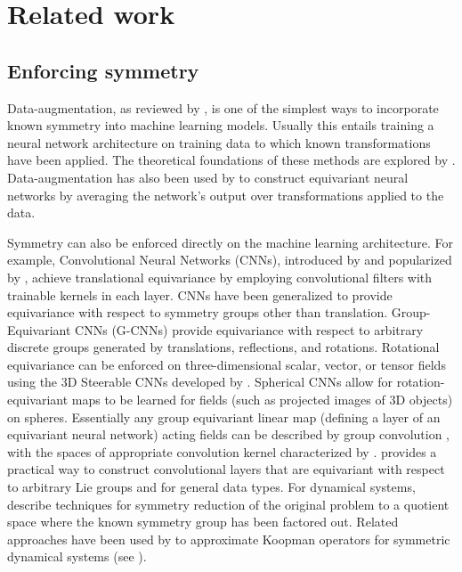 \documentclass[twoside,11pt]{article}
\begin{document}
\section{Related work}

\subsection{Enforcing symmetry}
\label{subsec:related_work_enforcing_symmetry}
Data-augmentation, as reviewed by \cite{shorten2019survey, van2001art}, is one of the simplest ways to incorporate known symmetry into machine learning models.
Usually this entails training a neural network architecture on training data to which known transformations have been applied.
The theoretical foundations of these methods are explored by \cite{Chen2020GroupAug}.
Data-augmentation has also been used by \cite{Benton2020learning} to construct equivariant neural networks by averaging the network's output over transformations applied to the data.

Symmetry can also be enforced directly on the machine learning architecture.
For example, Convolutional Neural Networks (CNNs), introduced by \cite{fukushima1980neocognitron} and popularized by \cite{lecun1989backpropagation}, achieve translational equivariance by employing convolutional filters with trainable kernels in each layer.
CNNs have been generalized to provide equivariance with respect to symmetry groups other than translation. 
Group-Equivariant CNNs (G-CNNs) \citep{Cohen2016GroupEqConv} provide equivariance with respect to arbitrary discrete groups generated by translations, reflections, and rotations. 
Rotational equivariance can be enforced on three-dimensional scalar, vector, or tensor fields using the 3D Steerable CNNs developed by \cite{weiler20183d}. 
Spherical CNNs \cite{cohen2018spherical, esteves2018learning} allow for rotation-equivariant maps to be learned for fields (such as projected images of 3D objects) on spheres. 
Essentially any group equivariant linear map (defining a layer of an equivariant neural network) acting fields can be described by group convolution \citep{Kondor2018generalization, Cohen2019general}, with the spaces of appropriate convolution kernel characterized by \cite{Cohen2019general}. 
\cite{Finzi2020generalizing} provides a practical way to construct convolutional layers that are equivariant with respect to arbitrary Lie groups and for general data types.
For dynamical systems, \cite{Marsden:MS,Rowley2003reduction, Abraham2008foundations} describe techniques for symmetry reduction of the original problem to a quotient space where the known symmetry group has been factored out.
Related approaches have been used by \cite{peitz2023partial, steyert2022uncovering} to approximate Koopman operators for symmetric dynamical systems (see \cite{Koopman1931Hamiltonian, Mezic2005spectral, Mauroy2020koopman, Otto2021koopman, Brunton2022siamreview}).
\end{document}
